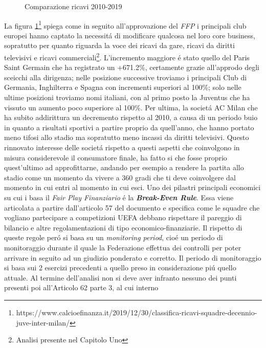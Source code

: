 \documentclass[
    corpo=12pt,
    oneside,
    evenboxes,
    tipotesi=triennale,
    stile=classica,
    oldstyle,
    autoretitolo,
    greek,
]{toptesi}
\begin{document}
\begin{interlinea}{1.5}
\begin{figure}
    \caption{Comparazione ricavi 2010-2019}
    \label{comp_ricavi_10_19}  
\end{figure}
La figura \ref{comp_ricavi_10_19}\footnote{https://www.calcioefinanza.it/2019/12/30/classifica-ricavi-squadre-decennio-juve-inter-milan/}
spiega come in seguito all'approvazione del \emph{FFP} i principali club europei hanno captato la necessit\'a di modificare qualcosa nel loro core business,
sopratutto per quanto riguarda la voce dei ricavi da gare, ricavi da diritti televisivi e ricavi commerciali\footnote{Analisi presente nel Capitolo Uno}.
L'incremento maggiore \'e stato quello del Paris Saint Germain che ha registrato un +671.2\%, certamente
grazie all'approdo degli sceicchi alla dirigenza; nelle posizione successive troviamo i principali Club di Germania, Inghilterra e Spagna
con incrementi \linebreak superiori al 100\%; solo nelle ultime posizioni troviamo nomi italiani, con al primo posto la Juventus che ha vissuto un aumento 
poco superiore al 100\%. Per ultima, la societ\'a AC Milan che ha subito addirittura un decremento rispetto al 2010,
a causa di un periodo buio in quanto a risultati sportivi a partire proprio da quell'anno, che hanno portato meno tifosi allo stadio ma sopratutto meno incassi 
da diritti televisivi.\newline
Questo rinnovato interesse delle societ\'a rispetto a questi aspetti che coinvolgono in misura considerevole il consumatore finale, ha fatto
si che fosse proprio quest'ultimo ad approfittarne, andando per esempio a rendere la partita allo stadio come
un momento da vivere a 360 gradi che ti deve coinvolgere dal momento in cui entri al momento in cui esci.\newline
Uno dei pilastri principali economici su cui i basa il \emph{Fair Play Finanziario} \'e la \emph{\textbf{Break-Even Rule}}.
Essa viene articolata a partire dall'articolo 57 del documento e specifica come le squadre che vogliano partecipare a competizioni UEFA debbano
rispettare il pareggio di bilancio e altre regolamentazioni di tipo economico-\linebreak finanziarie. Il rispetto di queste regole per\'o si basa su 
un \emph{monitoring period}, cio\'e un periodo di monitoraggio durante il quale la Federazione effettua dei controlli per poter arrivare in seguito 
ad un giudizio ponderato e corretto. Il periodo di monitoraggio si basa sui 2 esercizi precedenti a quello preso in considerazione pi\'u quello attuale.
Al termine dell'analisi non si deve aver infranto nessuno dei punti presenti poi all'Articolo 62 parte 3, al cui interno 

\end{interlinea}
\end{document}

